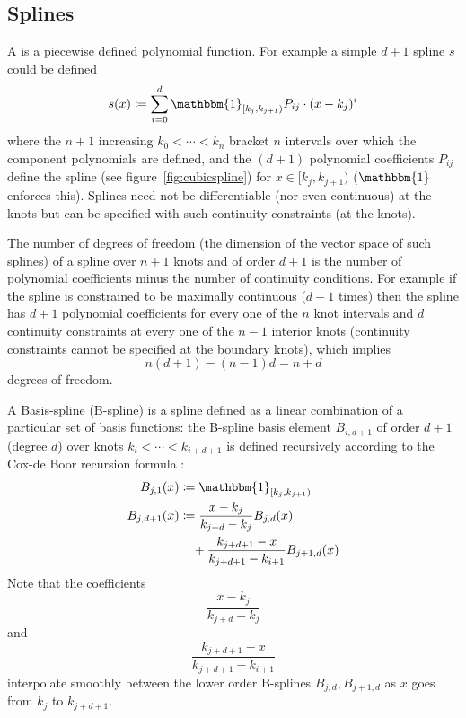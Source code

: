 \subsection{Splines}\label{subsubsec:splines}

A  is a piecewise defined polynomial function. For example a simple  \(d+1\) spline \(s\) could be defined
%
\[
    s(x) \coloneqq \sum_{i=0}^d \mathbbm{1}_{[k_j, k_{j+1})}P_{ij} \cdot (x - k_j)^i
\]
%
where the \(n+1\) increasing  \(k_0 < \cdots < k_n\) bracket \(n\) intervals over which the component polynomials are defined, and the \((d+1)\) polynomial coefficients \(P_{ij}\) define the spline (see figure~\ref{fig:cubicspline}) for \(x \in [k_j, k_{j+1})\) (\(\mathbbm{1}\) enforces this).
%
Splines need not be differentiable (nor even continuous) at the knots but can be specified with such continuity constraints (at the knots).

The number of degrees of freedom (the dimension of the vector space of such splines) of a spline over \(n+1\) knots and of order \(d+1\) is the number of polynomial coefficients minus the number of continuity conditions.
%
For example if the spline is constrained to be maximally continuous (\(d-1\) times) then the spline has \(d+1\) polynomial coefficients for every one of the \(n\) knot intervals and \(d\) continuity constraints at every one of the \(n-1\) interior knots (continuity constraints cannot be specified at the boundary knots), which implies
\[
    n(d+1) - (n-1)d = n+d
\]
degrees of freedom.

A Basis-spline (B-spline) is a spline defined as a linear combination of a particular set of basis functions: the B-spline basis element \(B_{i, d+1}\) of order \(d+1\) (degree \(d\)) over knots \(k_i < \cdots < k_{i+d+1}\) is defined recursively according to the Cox-de Boor recursion formula \cite{de1971subroutine}:
\begin{align}
    B_{j,1} (x)   & \coloneqq \mathbbm{1}_{[k_j, k_{j+1})}                         \\
    B_{j,d+1} (x) & \coloneqq \frac{x-k_j}{k_{j+d} - k_j} B_{j,d} (x)              \\
                  & \quad+ \frac{k_{j+d+1} - x}{k_{j+d+1} - k_{i+1}} B_{j+1,d} (x)
\end{align}
%
Note that the coefficients
%
\[
    \frac{x-k_j}{k_{j+d} - k_j}
\]
%
and
%
\[
    \frac{k_{j+d+1} - x}{k_{j+d+1} - k_{i+1}}
\]
%
interpolate smoothly between the lower order B-splines \(B_{j,d}, B_{j+1,d}\) as \(x\) goes from \(k_j\) to \(k_{j+d+1}\).


